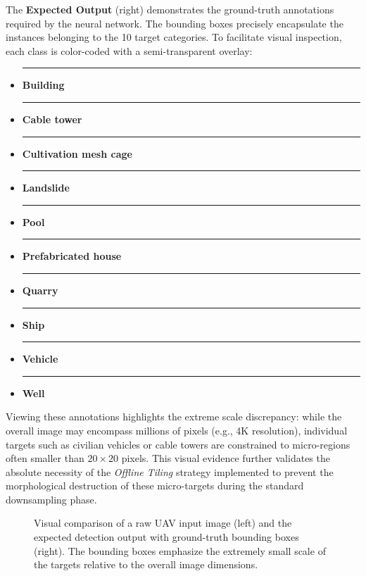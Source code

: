 The \textbf{Expected Output} (right) demonstrates the ground-truth annotations required by the neural network. The bounding boxes precisely encapsulate the instances belonging to the 10 target categories. To facilitate visual inspection, each class is color-coded with a semi-transparent overlay:
\begin{itemize}
    \item \textcolor[HTML]{E6194B}{\rule{1em}{1em}} \textbf{Building}
    \item \textcolor[HTML]{911EB4}{\rule{1em}{1em}} \textbf{Cable tower}
    \item \textcolor[HTML]{D2F53C}{\rule{1em}{1em}} \textbf{Cultivation mesh cage}
    \item \textcolor[HTML]{F032E6}{\rule{1em}{1em}} \textbf{Landslide}
    \item \textcolor[HTML]{46F0F0}{\rule{1em}{1em}} \textbf{Pool}
    \item \textcolor[HTML]{0082C8}{\rule{1em}{1em}} \textbf{Prefabricated house}
    \item \textcolor[HTML]{FABED4}{\rule{1em}{1em}} \textbf{Quarry}
    \item \textcolor[HTML]{3CB44B}{\rule{1em}{1em}} \textbf{Ship}
    \item \textcolor[HTML]{FFE119}{\rule{1em}{1em}} \textbf{Vehicle}
    \item \textcolor[HTML]{F58230}{\rule{1em}{1em}} \textbf{Well}
\end{itemize}

Viewing these annotations highlights the extreme scale discrepancy: while the overall image may encompass millions of pixels (e.g., 4K resolution), individual targets such as civilian vehicles or cable towers are constrained to micro-regions often smaller than $20 \times 20$ pixels. This visual evidence further validates the absolute necessity of the \textit{Offline Tiling} strategy implemented to prevent the morphological destruction of these micro-targets during the standard downsampling phase.

\begin{figure}[hbt!]
    \centering
    \caption{Visual comparison of a raw UAV input image (left) and the expected detection output with ground-truth bounding boxes (right). The bounding boxes emphasize the extremely small scale of the targets relative to the overall image dimensions.}
    \label{fig:dataset_examples}
\end{figure}
